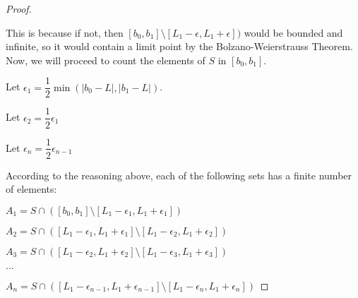 \documentclass[letterpaper]{article}
\begin{document}
\begin{proof}
\begin{center}
\end{center}
%
This is because if not, then $[b_0,b_1] \setminus [L_1 - \epsilon, L_1 + \epsilon])$ would be bounded and infinite, so it would contain a limit point by the Bolzano-Weierstrauss Theorem. 
%
Now, we will proceed to count the elements of $S$ in $[b_0, b_1]$. 

Let $\epsilon_1 = \dfrac{1}{2} \min(|b_0-L|, |b_1-L|)$.

Let $\epsilon_2 = \dfrac{1}{2} \epsilon_1 \quad$

Let $\epsilon_n = \dfrac{1}{2} \epsilon_{n-1} \quad$

\begin{center}
\end{center}
%
According to the reasoning above, each of the following sets has a finite number of elements:

$A_1 = S \cap ( [b_0,b_1] \setminus [L_1 - \epsilon_1, L_1 + \epsilon_1] )$

$A_2 = S \cap ( [L_1 - \epsilon_1, L_1 + \epsilon_1] \setminus [L_1 - \epsilon_2, L_1 + \epsilon_2] )$

$A_3 = S \cap ( [L_1 - \epsilon_2, L_1 + \epsilon_2] \setminus [L_1 - \epsilon_3, L_1 + \epsilon_3] )$

$\ldots$

$A_n = S \cap ( [L_1 - \epsilon_{n-1}, L_1 + \epsilon_{n-1}] \setminus [L_1 - \epsilon_n, L_1 + \epsilon_n] )$


\end{proof}
\end{document}
